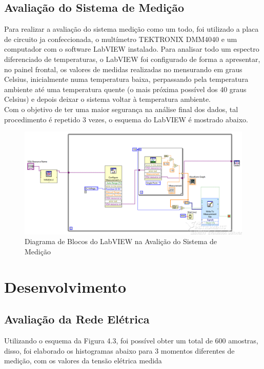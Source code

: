\documentclass[14pt, oneside]{book}
\newcommand\tab[1][1cm]{\hspace*{#1}}
\theoremstyle{definition}
\begin{document}
            \section{Avaliação do Sistema de Medição}
                \tab Para realizar a avaliação do sistema medição como um todo, foi utilizado a placa de circuito ja confeccionada, o multímetro TEKTRONIX DMM4040 e um computador com o software LabVIEW instalado. Para analisar todo um espectro diferenciado de temperaturas, o LabVIEW foi configurado de forma a apresentar, no painel frontal, os valores de medidas realizadas no mensurando em graus Celsius, inicialmente numa temperatura baixa, perpassando pela temperatura ambiente até uma temperatura quente (o mais próxima possível dos 40 graus Celsius) e depois deixar o sistema voltar à temperatura ambiente. \\
                \tab Com o objetivo de ter uma maior segurança na análise final dos dados, tal procedimento é repetido $3$ vezes, o esquema do LabVIEW é mostrado abaixo.
                
                \begin{figure}[H]
                    \centering
                    \includegraphics[scale = 0.5]{Labview_temperatura.PNG}
                    \caption{Diagrama de Blocos do LabVIEW na Avalição do Sistema de Medição}
                    \label{labviewmedicao}
                \end{figure}
                
                
                
        \chapter{Desenvolvimento}
        
            \section{Avaliação da Rede Elétrica}
                \tab Utilizando o esquema da Figura 4.3, foi possível obter um total de $600$ amostras, disso, foi elaborado os histogramas abaixo para $3$ momentos diferentes de medição, com os valores da tensão elétrica medida
                
\end{document}
